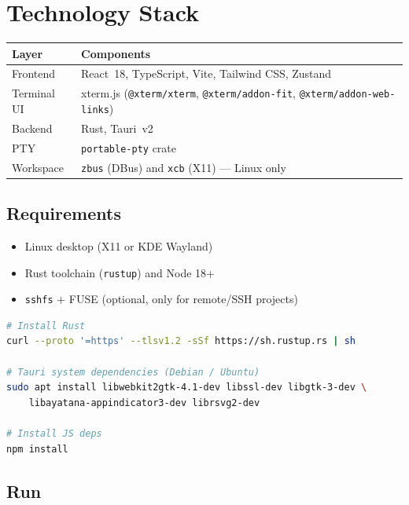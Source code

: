 \documentclass[11pt,a4paper]{article}
\newcommand{\code}[1]{\texttt{#1}}
\begin{document}
\section{Technology Stack}

\begin{longtable}{@{}p{4.2cm}p{10.5cm}@{}}
\toprule
\textbf{Layer} & \textbf{Components} \\
\midrule
\endhead
Frontend        & React~18, TypeScript, Vite, Tailwind CSS, Zustand \\
Terminal UI     & xterm.js (\code{@xterm/xterm}, \code{@xterm/addon-fit}, \code{@xterm/addon-web-links}) \\
Backend         & Rust, Tauri~v2 \\
PTY             & \code{portable-pty} crate \\
Workspace       & \code{zbus} (DBus) and \code{xcb} (X11) --- Linux only \\
\bottomrule
\end{longtable}

\subsection{Requirements}

\begin{itemize}
  \item Linux desktop (X11 or KDE Wayland)
  \item Rust toolchain (\code{rustup}) and Node 18+
  \item \code{sshfs} + FUSE (optional, only for remote/SSH projects)
\end{itemize}

\begin{lstlisting}[language=bash]
# Install Rust
curl --proto '=https' --tlsv1.2 -sSf https://sh.rustup.rs | sh

# Tauri system dependencies (Debian / Ubuntu)
sudo apt install libwebkit2gtk-4.1-dev libssl-dev libgtk-3-dev \
    libayatana-appindicator3-dev librsvg2-dev

# Install JS deps
npm install
\end{lstlisting}

\subsection{Run}
\end{document}
